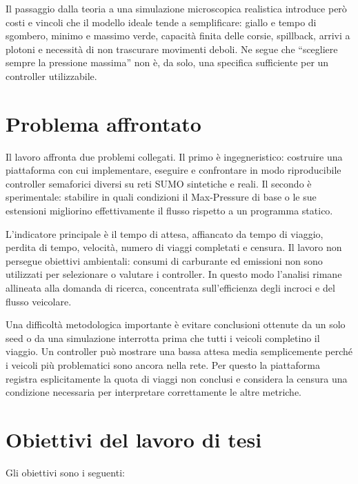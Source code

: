 \documentclass[12pt,a4paper,oneside]{report}
\numberwithin{equation}{chapter}
\begin{document}
Il passaggio dalla teoria a una simulazione microscopica realistica introduce
però costi e vincoli che il modello ideale tende a semplificare: giallo e
tempo di sgombero, minimo e massimo verde, capacità finita delle corsie,
spillback, arrivi a plotoni e necessità di non trascurare movimenti deboli. Ne
segue che ``scegliere sempre la pressione massima'' non è, da solo, una
specifica sufficiente per un controller utilizzabile.

\section{Problema affrontato}

Il lavoro affronta due problemi collegati. Il primo è ingegneristico: costruire
una piattaforma con cui implementare, eseguire e confrontare in modo
riproducibile controller semaforici diversi su reti SUMO sintetiche e reali. Il
secondo è sperimentale: stabilire in quali condizioni il Max-Pressure di base
o le sue estensioni migliorino effettivamente il flusso rispetto a un programma
statico.

L'indicatore principale è il tempo di attesa, affiancato da tempo di viaggio,
perdita di tempo, velocità, numero di viaggi completati e censura. Il lavoro
non persegue obiettivi ambientali: consumi di carburante ed emissioni non sono
utilizzati per selezionare o valutare i controller. In questo modo l'analisi
rimane allineata alla domanda di ricerca, concentrata sull'efficienza degli
incroci e del flusso veicolare.

Una difficoltà metodologica importante è evitare conclusioni ottenute da un
solo seed o da una simulazione interrotta prima che tutti i veicoli completino
il viaggio. Un controller può mostrare una bassa attesa media semplicemente
perché i veicoli più problematici sono ancora nella rete. Per questo la
piattaforma registra esplicitamente la quota di viaggi non conclusi e considera
la censura una condizione necessaria per interpretare correttamente le altre
metriche.

\section{Obiettivi del lavoro di tesi}

Gli obiettivi sono i seguenti:
\end{document}
